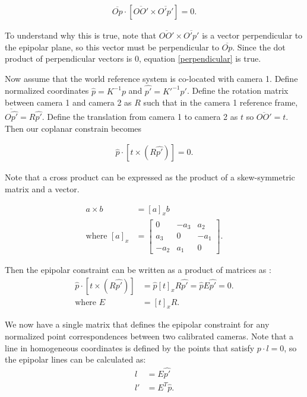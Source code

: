 \documentclass[twoside]{article}
\begin{document}
\begin{align}
\overline{Op} \cdot [\overline{OO'} \times \overline{O'p'}] = 0.
\label{perpendicular}
\end{align}

To understand why this is true, note that $\overline{OO'} \times \overline{O'p'}$ is a vector perpendicular to the epipolar plane, so this vector must be perpendicular to $\overline{Op}$. Since the dot product of perpendicular vectors is 0, equation \ref{perpendicular} is true. 

Now assume that the world reference system is co-located with camera 1. Define normalized coordinates $\hat{p} = K^{-1}p$ and $\hat{p'} = K'^{-1}p'$. Define the rotation matrix between camera 1 and camera 2 as $R$ such that in the camera 1 reference frame, $\overline{O\hat{p'}} = R\hat{p'}$. Define the translation from camera 1 to camera 2 as $t$ so $\overline{OO'} = t$. Then our coplanar constrain becomes

\begin{align}
\hat{p} \cdot [t \times (R\hat{p'})] = 0.
\end{align}

Note that a cross product can be expressed as the product of a skew-symmetric matrix and a vector.

\begin{align}
a \times b &= [a]_x b \\
\text{where } [a]_x &= \begin{bmatrix}
0 & -a_3 & a_2 \\
a_3 & 0 & -a_1 \\
-a_2 & a_1 & 0
\end{bmatrix} .
\end{align}

Then the epipolar constraint can be written as a product of matrices as :
\begin{align}
\hat{p} \cdot [t \times (R\hat{p'})] &= \hat{p} [t]_x R \hat{p'} = \hat{p}E\hat{p'} = 0. \\
\text{where } E &= [t]_xR.
\end{align}

We now have a single matrix that defines the epipolar constraint for any normalized point correspondences between two calibrated cameras. Note that a line in homogeneous coordinates is defined by the points that satisfy $p \cdot l = 0$, so the epipolar lines can be calculated as:
\begin{align}
l &= E\hat{p'} \\
l' &= E^T\hat{p}.
\end{align}
\end{document}
